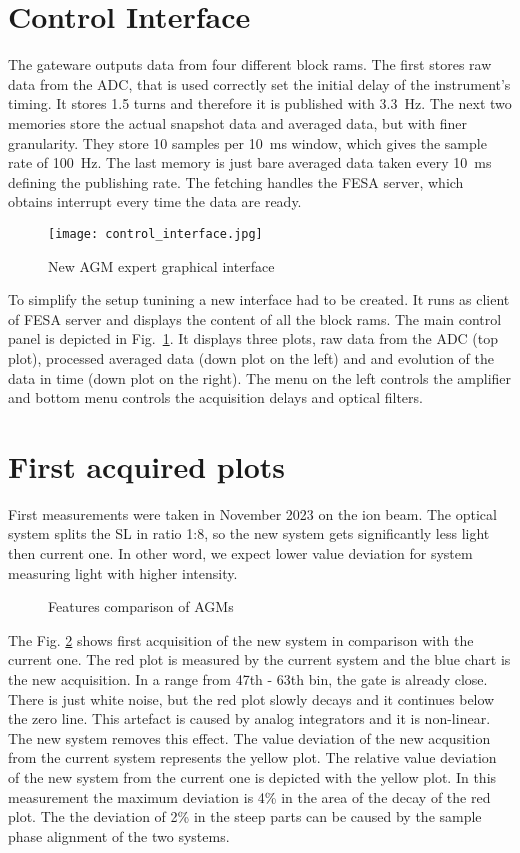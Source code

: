 \section{Control Interface}
The gateware outputs data from four different block rams. The first stores raw
data from the ADC, that is used correctly set the initial delay of the
instrument's timing. It stores 1.5 turns and therefore it is published with
\SI{3.3}{Hz}. The next two memories store the actual snapshot data and averaged
data, but with finer granularity. They store 10 samples per \SI{10}{ms} window,
which gives the sample rate of \SI{100}{Hz}. The last memory is just bare
averaged data taken every \SI{10}{ms} defining the publishing rate. The
fetching handles the FESA server, which obtains interrupt every time the data
are ready. 
\begin{figure}[!tbh]
    \centering
    \texttt{[image: control\_interface.jpg]}
    \caption{New AGM expert graphical interface}
    \label{fig:control_interface}
\end{figure}
To simplify the setup tunining a new interface had to be created. It runs as
client of FESA server and displays the content of all the block rams. The main
control panel is depicted in Fig.~\ref{fig:control_interface}. It displays
three plots, raw data from the ADC (top plot), processed averaged data (down
plot on the left) and and evolution of the data in time (down plot on the
right). The menu on the left controls the amplifier and bottom menu controls
the acquisition delays and optical filters.

\section{First acquired plots}
First measurements were taken in November 2023 on the ion beam. The
optical system splits the SL in ratio 1:8, so the new system gets
significantly less light then current one. In other word, we expect
lower value deviation for system measuring light with higher intensity.  
\begin{figure}[!htb]
    \begin{center}
        \scalebox{0.54}{}
        \caption{Features comparison of AGMs}
        \label{fig:comparison_chart}
    \end{center}
\end{figure}
The Fig. \ref{fig:comparison_chart} shows first acquisition of the new system
in comparison with the current one. The red plot is measured by the current
system and the blue chart is the new acquisition. In a range from 47th - 63th
bin, the gate is already close. There is just white noise, but the red plot
slowly decays and it continues below the zero line. This artefact is caused by
analog integrators and it is non-linear. The new system removes this effect.
The value deviation of the new acqusition from the current system represents
the yellow plot. The relative value deviation of the new system from the
current one is depicted with the yellow plot. In this measurement the maximum
deviation is 4\% in the area of the decay of the red plot. The the deviation of
2\% in the steep parts can be caused by the sample phase alignment of the two
systems.   

